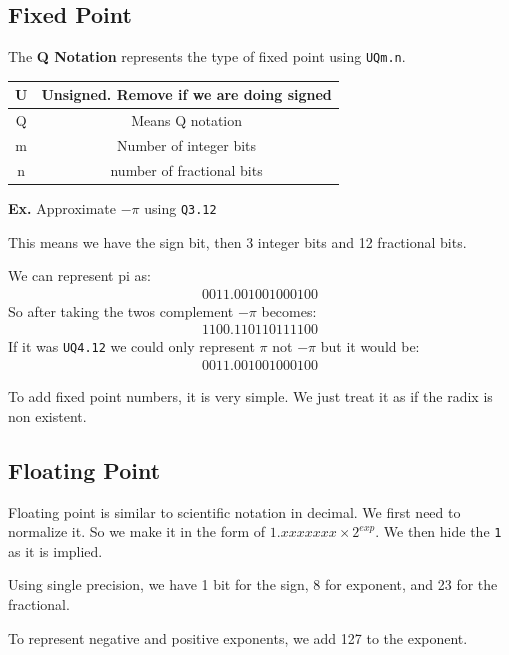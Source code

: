 \documentclass[12pt,letterpaper]{article} \usepackage{amsmath} \usepackage{graphicx} \usepackage[margin=1in]{geometry} \usepackage{longtable}  \usepackage{amssymb}
\begin{document}
	\subsection{Fixed Point}
	The \textbf{Q Notation} represents the type of fixed point using \verb|UQm.n|. 
	\begin{center}
		\begin{tabular}{|c||c|}
			\hline
			U & Unsigned. Remove if we are doing signed \\
			\hline
			Q & Means Q notation \\
			\hline
			m & Number of integer bits \\
			\hline
			n & number of fractional bits \\
			\hline
		\end{tabular}
	\end{center}
	
	\begin{mdframed}
		\textbf{Ex. } Approximate $-\pi$ using \verb*|Q3.12|
		
		This means we have the sign bit, then 3 integer bits and 12 fractional bits. 
		
		We can represent pi as:
		\begin{align*}
			0011.001001000100
		\end{align*}
		So after taking the twos complement $- \pi$ becomes:
		\begin{align*}
			1100.110110111100
		\end{align*}
		If it was \verb*|UQ4.12| we could only represent $\pi$ not $-\pi$ but it would be:
		\begin{align*}
			0011.001001000100
		\end{align*}
	\end{mdframed}
	
	To add fixed point numbers, it is very simple. We just treat it as if the radix is non existent. 
	
	\subsection{Floating Point}
	Floating point is similar to scientific notation in decimal. We first need to normalize it. So we make it in the form of $1.xxxxxxx \times  2^{exp}$. We then hide the \verb*|1| as it is implied. 
	
	Using single precision, we have 1 bit for the sign, 8 for exponent, and 23 for the fractional. 
	
	To represent negative and positive exponents, we add 127 to the exponent. 
	
\end{document}
